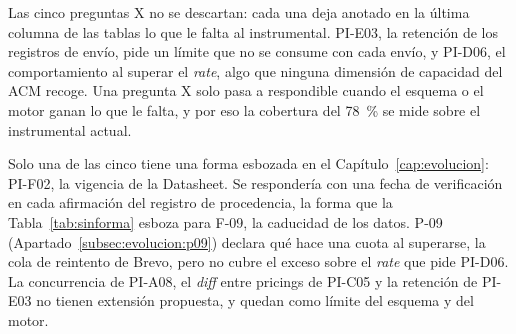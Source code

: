 Las cinco preguntas X no se descartan: cada una deja anotado en la última columna de las tablas lo que le falta al instrumental.
PI-E03, la retención de los registros de envío, pide un límite que no se consume con cada envío, y PI-D06, el comportamiento al superar el \textit{rate}, algo que ninguna dimensión de capacidad del ACM recoge.
Una pregunta X solo pasa a respondible cuando el esquema o el motor ganan lo que le falta, y por eso la cobertura del 78~\% se mide sobre el instrumental actual.

Solo una de las cinco tiene una forma esbozada en el Capítulo~\ref{cap:evolucion}: PI-F02, la vigencia de la Datasheet.
Se respondería con una fecha de verificación en cada afirmación del registro de procedencia, la forma que la Tabla~\ref{tab:sinforma} esboza para F-09, la caducidad de los datos.
P-09 (Apartado~\ref{subsec:evolucion:p09}) declara qué hace una cuota al superarse, la cola de reintento de Brevo, pero no cubre el exceso sobre el \textit{rate} que pide PI-D06.
La concurrencia de PI-A08, el \textit{diff} entre pricings de PI-C05 y la retención de PI-E03 no tienen extensión propuesta, y quedan como límite del esquema y del motor.
